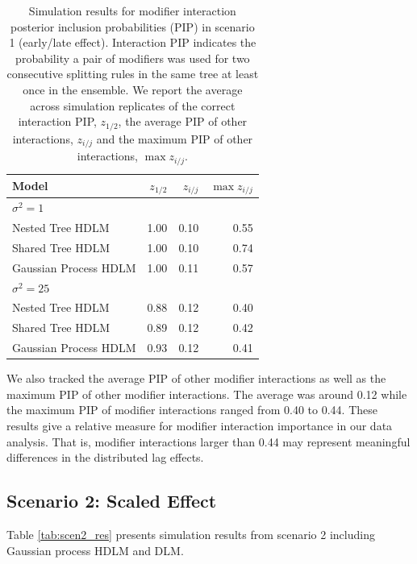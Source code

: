 \documentclass[12pt]{article}
\begin{document}
\begin{table}[!ht]
\footnotesize
    \centering
    \caption{Simulation results for modifier interaction posterior inclusion probabilities (PIP) in scenario 1 (early/late effect). Interaction PIP indicates the probability a pair of modifiers was used for two consecutive splitting rules in the same tree at least once in the ensemble. We report the average across simulation replicates of the correct interaction PIP, $z_{1/2}$, the average PIP of other interactions, $z_{i/j}$ and the maximum PIP of other interactions, $\max z_{i/j}$.}\vspace{6pt}
    \label{tab:scen1_inc2}
    \begin{tabular}{lrrr}
        \toprule[2pt]
        Model & $z_{1/2}$ & $z_{i/j}$ & $\max z_{i/j}$\\
        \midrule
        \multicolumn{4}{l}{$\sigma^2=1$}\\
Nested Tree HDLM & 1.00 & 0.10 & 0.55\\
Shared Tree HDLM & 1.00 & 0.10 & 0.74\\
Gaussian Process HDLM & 1.00 & 0.11 & 0.57\\

        \midrule
        \multicolumn{4}{l}{$\sigma^2=25$}\\
Nested Tree HDLM & 0.88 & 0.12 & 0.40\\
Shared Tree HDLM & 0.89 & 0.12 & 0.42\\
Gaussian Process HDLM & 0.93 & 0.12 & 0.41\\

        \bottomrule[2pt]
    \end{tabular}
\end{table}


We also tracked the average PIP of other modifier interactions as well as the maximum PIP of other modifier interactions. The average was around 0.12 while the maximum PIP of modifier interactions ranged from 0.40 to 0.44. These results give a relative measure for modifier interaction importance in our data analysis. That is, modifier interactions larger than 0.44 may represent meaningful differences in the distributed lag effects.


\subsection{Scenario 2: Scaled Effect}
Table \ref{tab:scen2_res} presents simulation results from scenario 2 including Gaussian process HDLM and DLM.
\end{document}
